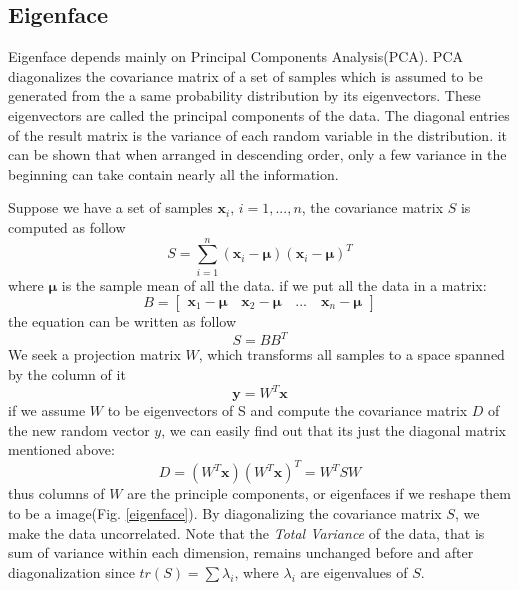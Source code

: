 \documentclass[conference]{IEEEtran}
\begin{document}
\subsection{Eigenface}
Eigenface depends mainly on Principal Components Analysis(PCA). PCA diagonalizes the covariance matrix of a set of samples which is assumed to be generated from the a same probability distribution by its eigenvectors. These eigenvectors are called the principal components of the data. The diagonal entries of the result matrix is the variance of each random variable in the distribution. it can be shown that when arranged in descending order, only a few variance in the beginning can take contain nearly all the information.

Suppose we have a set of samples $\bm{x}_i,\, i=1,...,n$, the covariance matrix $S$ is computed as follow
\begin{equation}
	S= \sum_{i=1}^{n}(\bm{x}_i-\bm{\mu})(\bm{x}_i-\bm{\mu})^T
\end{equation}
where $\bm{\mu}$ is the sample mean of all the data.
if we put all the data in a matrix:
\begin{equation}
	B = 
	\begin{bmatrix}
	\bm{x}_1-\bm{\mu}\quad\bm{x}_2-\bm{\mu}\quad ...\quad\bm{x}_n-\bm{\mu}
	\end{bmatrix}
\end{equation}
the equation can be written as follow
\begin{equation}
	S = BB^T
\end{equation}
We seek a projection matrix $W$, which transforms all samples to a space spanned by the column of it
\begin{equation}
	\bm{y} = W^T\bm{x}
\end{equation}
if we assume $W$ to be eigenvectors of S and compute the covariance matrix $D$ of the new random vector $y$, we can easily find out that its just the diagonal matrix mentioned above:
\begin{equation}
	D=(W^T\bm{x})(W^T\bm{x})^T = W^TSW
\end{equation} 
thus columns of $W$ are the principle components, or eigenfaces if we reshape them to be a image(Fig. \ref{eigenface}). By diagonalizing the covariance matrix $S$, we make the data uncorrelated. Note that the \textit{Total Variance} of the data, that is sum of variance within each dimension, remains unchanged before and after diagonalization since $tr(S) = \sum \lambda_i$, where $\lambda_i$ are eigenvalues of $S$.
\end{document}
